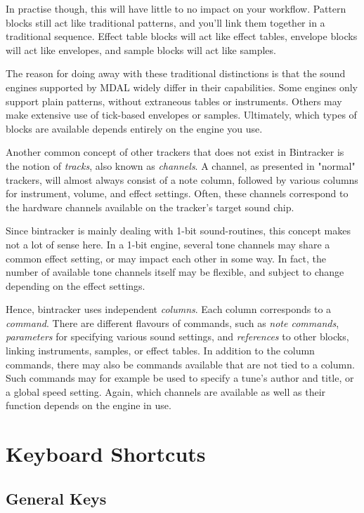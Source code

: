 \documentclass[12pt]{report}	%
\begin{document}
In practise though, this will have little to no impact on your workflow. Pattern blocks still act like traditional patterns, and you'll link them together in a traditional sequence. Effect table blocks will act like effect tables, envelope blocks will act like envelopes, and sample blocks will act like samples.

The reason for doing away with these traditional distinctions is that the sound engines supported by MDAL widely differ in their capabilities. Some engines only support plain patterns, without extraneous tables or instruments. Others may make extensive use of tick-based envelopes or samples. Ultimately, which types of blocks are available depends entirely on the engine you use.

Another common concept of other trackers that does not exist in Bintracker is the notion of \textit{tracks}, also known as \textit{channels}. A channel, as presented in "normal" trackers, will almost always consist of a note column, followed by various columns for instrument, volume, and effect settings. Often, these channels correspond to the hardware channels available on the tracker's target sound chip. 

Since bintracker is mainly dealing with 1-bit sound-routines, this concept makes not a lot of sense here. In a 1-bit engine, several tone channels may share a common effect setting, or may impact each other in some way. In fact, the number of available tone channels itself may be flexible, and subject to change depending on the effect settings.

Hence, bintracker uses independent \textit{columns}. Each column corresponds to a \textit{command}. There are different flavours of commands, such as \textit{note commands}, \textit{parameters} for specifying various sound settings, and \textit{references} to other blocks, linking instruments, samples, or effect tables. In addition to the column commands, there may also be commands available that are not tied to a column. Such commands may for example be used to specify a tune's author and title, or a global speed setting. Again, which channels are available as well as their function depends on the engine in use.



\chapter{Keyboard Shortcuts}
\section{General Keys}
\end{document}
